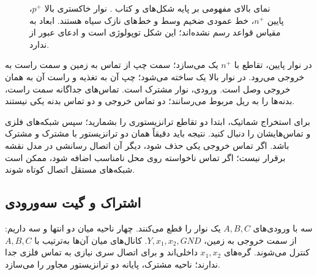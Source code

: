 \begin{figure}[ht]
\centering
\begin{latin}
\end{latin}
\caption{نمای بالای مفهومی  بر پایه شکل‌های 
و  کتاب \cite{weste}.
نوار خاکستری بالا \(p^+\)، پایین \(n^+\)، خط عمودی ضخیم وسط 
و خط‌های نازک سیاه  هستند. ابعاد به مقیاس قواعد رسم نشده‌اند؛
این شکل توپولوژی است و ادعای عبور از  ندارد.}
\label{fig:layout-inverter}
\end{figure}

در نوار پایین، تقاطع  با \(n^+\) یک  می‌سازد؛
سمت چپ از تماس به زمین و سمت راست به خروجی می‌رود.
در نوار بالا یک  ساخته می‌شود؛ چپ آن به تغذیه و راست آن به همان خروجی وصل است.
ورودی، نوار  مشترک است.
تماس‌های جداگانه سمت راست، بدنه‌ها را به ریل مربوط می‌رسانند؛
دو تماس خروجی و دو تماس بدنه یکی نیستند.

برای استخراج شماتیک، ابتدا دو تقاطع ترانزیستوری را بشمارید؛ سپس شبکه‌های فلزی
و تماس‌هایشان را دنبال کنید. نتیجه باید دقیقاً همان دو ترانزیستور با
 مشترک و  مشترک باشد.
اگر تماس خروجی یکی حذف شود، دیگر آن اتصال رسانشی در مدل نقشه برقرار نیست؛
اگر تماس ناخواسته روی محل نامناسب اضافه شود، ممکن است شبکه‌های مستقل اتصال کوتاه شوند.

\subsection{اشتراک  و گیت  سه‌ورودی}
سه  با ورودی‌های \(A,B,C\) یک نوار  را قطع می‌کنند.
چهار ناحیه میان دو انتها و سه  داریم: از سمت خروجی به زمین،
\(Y,x_1,x_2,GND\). کانال‌های میان آن‌ها به‌ترتیب با \(A,B,C\) کنترل می‌شوند.
گره‌های \(x_1,x_2\) داخلی‌اند و برای اتصال سری نیازی به تماس فلزی جدا ندارند؛
ناحیه مشترک، پایانه دو ترانزیستور مجاور را می‌سازد.

